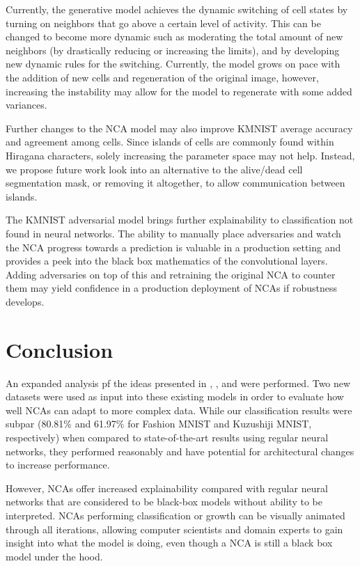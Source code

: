\documentclass[conference]{IEEEtran}
\begin{document}
Currently, the generative model achieves the dynamic switching of cell states by turning on neighbors that go above a certain level of activity. This can be changed to become more dynamic such as moderating the total amount of new neighbors (by drastically reducing or increasing the limits), and by developing new dynamic rules for the switching. Currently, the model grows on pace with the addition of new cells and regeneration of the original image, however, increasing the instability may allow for the model to regenerate with some added variances.

Further changes to the NCA model may also improve KMNIST average accuracy and agreement among cells. Since islands of cells are commonly found within Hiragana characters, solely increasing the parameter space may not help. Instead, we propose future work look into an alternative to the alive/dead cell segmentation mask, or removing it altogether, to allow communication between islands.

The KMNIST adversarial model brings further explainability to classification not found in neural networks. The ability to manually place adversaries and watch the NCA progress towards a prediction is valuable in a production setting and provides a peek into the black box mathematics of the convolutional layers. Adding adversaries on top of this and retraining the original NCA to counter them may yield confidence in a production deployment of NCAs if robustness develops.

\section{Conclusion}
An expanded analysis pf the ideas presented in \cite{selforg}, \cite{self-classify}, and \cite{adversarial} were performed. Two new datasets were used as input into these existing models in order to evaluate how well NCAs can adapt to more complex data. While our classification results were subpar (80.81\% and 61.97\% for Fashion MNIST and Kuzushiji MNIST, respectively) when compared to state-of-the-art results using regular neural networks, they performed reasonably and have potential for architectural changes to increase performance.

However, NCAs offer increased explainability compared with regular neural networks that are considered to be black-box models without ability to be interpreted. NCAs performing classification or growth can be visually animated through all iterations, allowing computer scientists and domain experts to gain insight into what the model is doing, even though a NCA is still a black box model under the hood.
\end{document}
